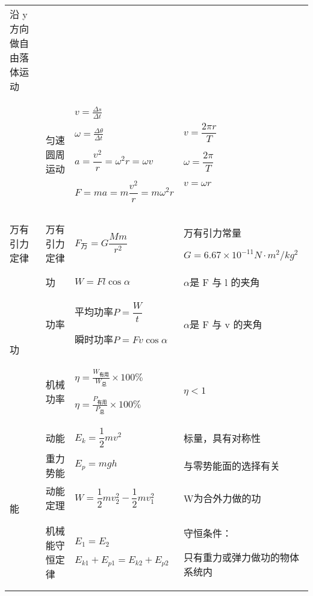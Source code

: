 \documentclass[cn,10.5pt,chinese,mac,chinesefont=founder]{elegantbook}
\begin{document}
\begin{longtable}[]{@{}|m{1.07cm}|m{2.43cm}|m{4cm}|m{5.5cm}|@{}}
	沿 y 方向做自由落体运动\tabularnewline
	\cline{2-4}
	&匀速圆周运动&
	$v=\frac{\Delta s}{\Delta t}$

	$\omega=\frac{\Delta \theta}{\Delta t}$

	$a=\dfrac{v^2}{r}=\omega^2r=\omega v$

	$F=ma=m\dfrac{v^2}{r}=m\omega^2r$
	&
	$v=\dfrac{2\pi r}{T}$

	$\omega=\dfrac{2\pi}{T}$

	$v=\omega r$\tabularnewline
	\cline{1-4}
	万有引力定律&万有引力定律&$F_\text{万}=G\dfrac{Mm}{r^2}$&万有引力常量

	$G= 6.67 \times 10^{−11}N·𝑚^2/kg^2$\tabularnewline
	\cline{1-4}
	\multirow{3}{1cm}{功}
	&功 &$W=Fl\cos\alpha$&$\alpha$是 F 与 l 的夹角\tabularnewline
	\cline{2-4}
	&功率&
	平均功率$P=\dfrac{W}{t}$

	瞬时功率$P=Fv\cos\alpha$
	&$\alpha$是 F 与 v 的夹角\tabularnewline
	\cline{2-4}
	&机械功率&$\eta =\frac{W_\text{有用}}{W_\text{总}}\times 100\% $
	
	$\eta =\frac{P_\text{有用}}{P_\text{总}}\times 100\%$
	&$\eta<1$\tabularnewline
	\cline{1-4}
	\multirow{4}{1cm}{能}
	&
	动能&$E_k=\dfrac{1}{2}mv^2$&标量，具有对称性\tabularnewline
	\cline{2-4}
	&重力势能&$E_p=mgh$&与零势能面的选择有关\tabularnewline
	\cline{2-4}
	&动能定理&$W=\dfrac{1}{2}mv_2^2-\dfrac{1}{2}mv_1^2$&W为合外力做的功\tabularnewline
	\cline{2-4}
	&机械能守恒定律&
	$E_1=E_2$

	$E_{k1}+E_{p1}=E_{k2}+E_{p2}$
	&守恒条件：

	只有重力或弹力做功的物体系统内\tabularnewline
	\cline{1-4}
\end{longtable}
\end{document}
